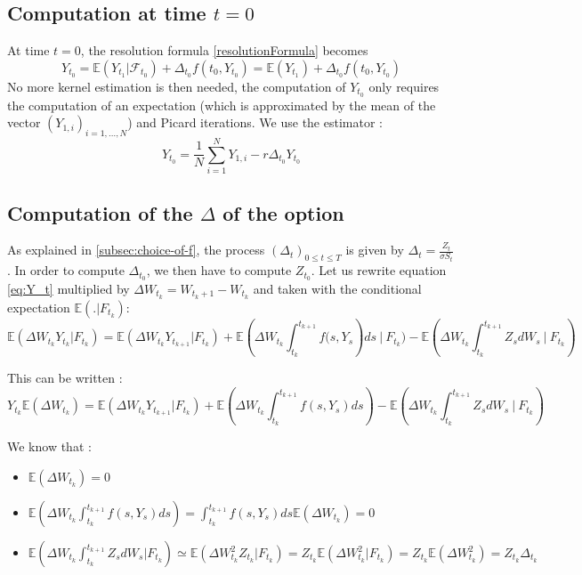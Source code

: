 \documentclass[a4paper,11pt,english]{book}
\begin{document}
\subsection{Computation at time $t=0$}
\label{subsec:computation-0}
At time $t=0$, the resolution formula \eqref{resolutionFormula} becomes $$Y_{t_{0}} = \mathbb{E}(Y_{t_{1}}|\mathcal{F}_{t_{0}}) + \Delta_{t_{0}}f(t_{0},Y_{t_{0}})=\mathbb{E}(Y_{t_{1}}) + \Delta_{t_{0}}f(t_{0},Y_{t_{0}})$$
No more kernel estimation is then needed, the computation of $Y_{t_{0}}$ only requires the computation of an expectation (which is approximated by the mean of the vector $(Y_{1,i})_{i=1,\ldots,N}$) and Picard iterations. We use the estimator :
$$Y_{t_{0}} = \frac{1}{N}\sum_{i=1}^{N}Y_{1,i}-r\Delta_{t_{0}}Y_{t_{0}}$$
\subsection{Computation of the $\Delta$ of the option}
As explained in \ref{subsec:choice-of-f}, the process $(\Delta_t)_{0 \leq t \leq T}$ is given by $\Delta_t=\frac{Z_t}{\sigma S_t}$. In order to compute $\Delta_{t_0}$, we then have to compute $Z_{t_0}$.
Let us rewrite equation \ref{eq:Y_t} multiplied by $\Delta W_{t_k} = W_{t_k+1}-W_{t_k}$ and taken with the conditional expectation $\mathbb{E}(.|F_{t_k})$:
$$\mathbb{E}(\Delta W_{t_k} Y_{t_{k}}|F_{t_k}) = \mathbb{E}(\Delta W_{t_k} Y_{t_{k+1}}|F_{t_k}) + \mathbb{E}\left(\Delta W_{t_k} \int_{t_{k}}^{t_{k+1}} f(s,Y_{s}\right) ds~\bigg\vert~F_{t_k}) - \mathbb{E}\left(\Delta W_{t_k} \int_{t_{k}}^{t_{k+1}}Z_{s} dW_{s}~\bigg\vert~F_{t_k}\right)$$

This can be written :
$$Y_{t_{k}}\mathbb{E}(\Delta W_{t_k}) = \mathbb{E}(\Delta W_{t_k} Y_{t_{k+1}}|F_{t_k}) + \mathbb{E}\left(\Delta W_{t_k} \int_{t_{k}}^{t_{k+1}} f(s,Y_{s}) ds\right)- \mathbb{E}\left(\Delta W_{t_k} \int_{t_{k}}^{t_{k+1}}Z_{s} dW_{s}~\bigg\vert~F_{t_k}\right)$$

We know that :
\begin{itemize}
    \item $\mathbb{E}(\Delta W_{t_k})=0$
    \item $\mathbb{E}(\Delta W_{t_k} \int_{t_{k}}^{t_{k+1}} f(s,Y_{s}) ds)=\int_{t_{k}}^{t_{k+1}} f(s,Y_{s}) ds \mathbb{E}(\Delta W_{t_k})=0$
    \item $\mathbb{E}(\Delta W_{t_k} \int_{t_{k}}^{t_{k+1}}Z_{s} dW_{s}|F_{t_k}) \simeq \mathbb{E}(\Delta W_{t_k}^2 Z_{t_k}|F_{t_k}) = Z_{t_k} \mathbb{E}(\Delta W_{t_k}^2|F_{t_k}) = Z_{t_k} \mathbb{E}(\Delta W_{t_k}^2) = Z_{t_k} \Delta_{t_k}$
\end{itemize}
\end{document}
